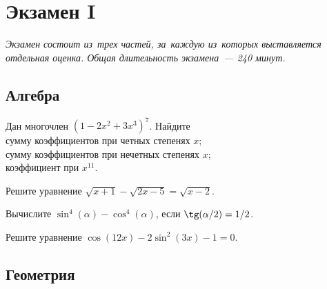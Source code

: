 
\section*{Экзамен I}

\emph{Экзамен состоит из~трех частей, за~каждую из~которых выставляется
отдельная оценка. Общая длительность экзамена~--- 240 минут.}

\subsection*{Алгебра}

\begin{problems}

Дан многочлен\enspace
$(1 - 2 x^2 + 3 x^3)^7$.
Найдите
\\
\subproblem
сумму коэффициентов при четных степенях $x$;
\\
\subproblem
сумму коэффициентов при нечетных степенях $x$;
\\
\subproblemx{*}
коэффициент при $x^{11}$.

Решите уравнение\enspace
$\sqrt{x + 1} - \sqrt{2 x - 5} = \sqrt{x - 2}$.

Вычислите\enspace
\(
        \sin^4(\alpha) - \cos^4(\alpha)
\),\enspace
если $\tg(\alpha / 2) = 1 / 2$.

Решите уравнение\enspace
$\cos(12 x) - 2 \sin^2(3 x) - 1 = 0$.

\end{problems}


\subsection*{Геометрия}

